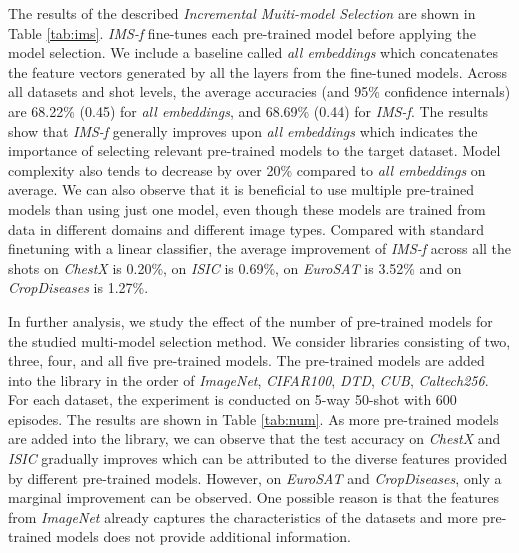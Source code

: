 \documentclass[runningheads]{llncs}
\begin{document}
The results of the described \textit{Incremental Muiti-model Selection} are shown in Table \ref{tab:ims}. \emph{IMS-f} fine-tunes each pre-trained model before applying the model selection. We include a baseline called \emph{all embeddings} which concatenates the feature vectors generated by all the layers from the fine-tuned models. Across all datasets and shot levels, the average accuracies (and 95\% confidence internals) are 68.22\% (0.45) for \emph{all embeddings}, and 68.69\% (0.44) for \emph{IMS-f}. The results show that \emph{IMS-f} generally improves upon \emph{all embeddings} which indicates the importance of selecting relevant pre-trained models to the target dataset. Model complexity also tends to decrease by over 20\% compared to \emph{all embeddings} on average. We can also observe that it is beneficial to use multiple pre-trained models than using just one model, even though these models are trained from data in different domains and different image types. Compared with standard finetuning with a linear classifier, the average improvement of \emph{IMS-f} across all the shots on \textit{ChestX} is 0.20\%, on \textit{ISIC} is 0.69\%, on \textit{EuroSAT} is 3.52\% and on \textit{CropDiseases} is 1.27\%.

In further analysis, we study the effect of the number of pre-trained models for the studied multi-model selection method. We consider libraries consisting of two, three, four, and all five pre-trained models. The pre-trained models are added into the library in the order of \textit{ImageNet}, \textit{CIFAR100}, \textit{DTD}, \textit{CUB}, \textit{Caltech256}. For each dataset, the experiment is conducted on 5-way 50-shot with 600 episodes. The results are shown in Table \ref{tab:num}. As more pre-trained models are added into the library, we can observe that the test accuracy on \textit{ChestX} and \textit{ISIC} gradually improves which can be attributed to the diverse features provided by different pre-trained models. However, on \textit{EuroSAT} and \textit{CropDiseases}, only a marginal improvement can be observed. One possible reason is that the features from \textit{ImageNet} already captures the characteristics of the datasets and more pre-trained models does not provide additional information.
\end{document}
